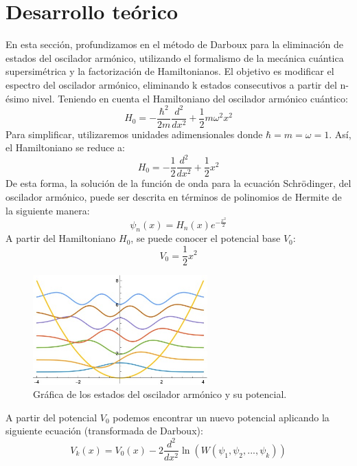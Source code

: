 \documentclass[%
 aip,
 jmp,%
 amsmath,amssymb,
 reprint,
]{revtex4-2}
\begin{document}
\section{Desarrollo teórico}
En esta sección, profundizamos en el método de Darboux para la eliminación de estados del oscilador armónico, utilizando el formalismo de la mecánica cuántica supersimétrica y la factorización de Hamiltonianos. El objetivo es modificar el espectro del oscilador armónico, eliminando k estados consecutivos a partir del n-ésimo nivel.
Teniendo en cuenta el Hamiltoniano del oscilador armónico cuántico:
\begin{equation}
H_0 = -\frac{\hbar^2}{2m} \frac{d^2}{dx^2} + \frac{1}{2} m \omega^2 x^2
\end{equation}
Para simplificar, utilizaremos unidades adimensionales donde \( \hbar = m = \omega = 1 \). Así, el Hamiltoniano se reduce a:
\begin{equation}
H_0 = -\frac{1}{2} \frac{d^2}{dx^2} + \frac{1}{2} x^2
\end{equation}
De esta forma, la solución de la función de onda para la ecuación Schrödinger, del oscilador armónico, puede ser descrita en términos de polinomios de Hermite de la siguiente manera:
\begin{equation}
\psi_n(x) = H_n(x) e^{-\frac{x^2}{2}}
\end{equation}
A partir del Hamiltoniano \( H_0 \), se puede conocer el potencial base \( V_0 \):
\begin{equation}
V_0=\frac{1}{2} x^2
\end{equation}
\begin{figure}[H]
    \centering
    \includegraphics[width=0.6\textwidth]{QuantumHarmonicOscillator.jpeg}
    \caption{Gráfica de los estados del oscilador armónico y su potencial.}
    \label{fig:modified_oscillator}
\end{figure}
A partir del potencial \( V_0 \) podemos encontrar un nuevo potencial aplicando la siguiente ecuación (transformada de Darboux):
\begin{equation}
V_k(x) = V_0(x) - 2 \frac{d^2}{dx^2} \ln(W(\psi_1, \psi_2, ..., \psi_k))
\end{equation}
\end{document}
